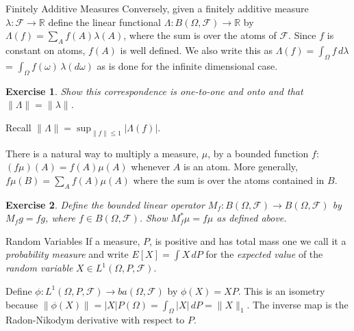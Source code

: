 \documentclass[fleqn]{amsart}
\newcommand{\R}{\mathbb{R}}
\newcommand{\F}{\mathcal{F}}
\newtheorem{exercise}{Exercise}
\begin{document}
\begin{section}{Finitely Additive Measures}
Conversely, given a finitely additive measure $\lambda\colon\F\to\R$
define the linear functional $\Lambda\colon B(\Omega,\F)\to\R$
by $\Lambda(f) = \sum_A f(A)\lambda(A)$, where the sum is over
the atoms of $\F$. Since $f$ is constant on atoms, $f(A)$ is
well defined. We also write this as $\Lambda(f) = \int_\Omega f\,d\lambda$
= $\int_\Omega f(\omega)\,\lambda(d\omega)$
as is done for the infinite dimensional case.

\begin{exercise}
Show this correspondence is one-to-one and onto and that
$\|\Lambda\| = \|\lambda\|$.
\end{exercise}

Recall $\|\Lambda\| = \sup_{\|f\|\le1} |\Lambda(f)|$.

There is a natural way to multiply a measure, $\mu$, by a bounded
function $f$: $(f\mu)(A) = f(A)\mu(A)$ whenever $A$ is an atom.
More generally, $f\mu(B) = \sum_A f(A)\mu(A)$ where the sum
is over the atoms contained in $B$.

\begin{exercise}
Define the bounded linear operator $M_f\colon B(\Omega,\F)\to B(\Omega, \F)$
by $M_f g = fg$, where $f\in B(\Omega,\F)$.
Show $M_f^*\mu = f\mu$ as defined above.
\end{exercise}

\end{section}

\begin{section}{Random Variables}
If a measure, $P$, is positive and has total mass one we call it a {\em
probability measure} and write $E[X] = \int X\,dP$ for the {\em expected
value} of the {\em random variable} $X\in L^1(\Omega, P, \F)$.

Define $\phi\colon L^1(\Omega, P, \F)\to ba(\Omega,\F)$ by
$\phi(X) = XP$. This is an isometry because $\|\phi(X)\|
= |X|P(\Omega)
= \int_\Omega |X|\,dP = \|X\|_1$. The inverse map is the
Radon-Nikodym derivative with respect to $P$.

\end{section}
\end{document}
